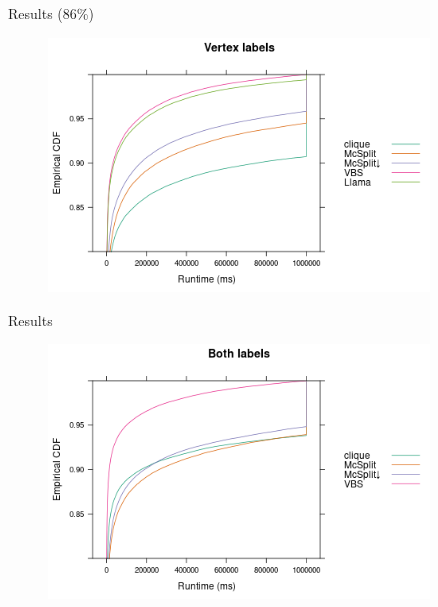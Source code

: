 \documentclass{beamer}
\begin{document}
\begin{frame}{Results (86\%)}
  \begin{figure}
    \centering
    \includegraphics[width=0.9\textwidth]{../dissertation/images/ecdf_vertex_labels_llama.png}
  \end{figure}
\end{frame}

\begin{frame}{Results}
  \begin{figure}
    \centering
    \includegraphics[width=0.9\textwidth]{../dissertation/images/ecdf_both_labels.png}
  \end{figure}
\end{frame}
\end{document}
